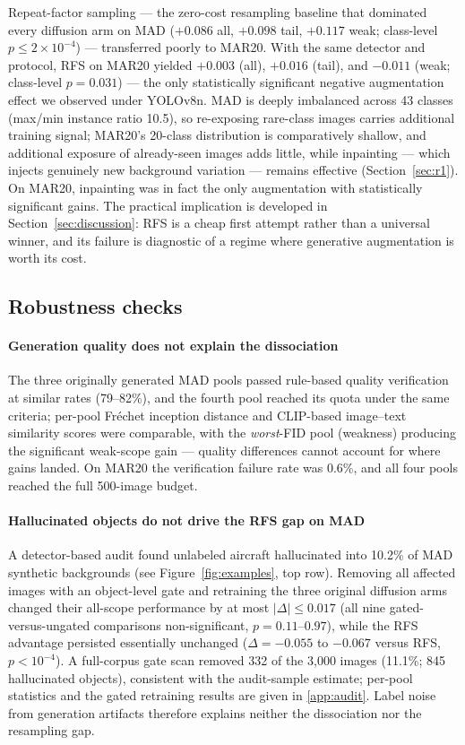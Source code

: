 \documentclass[preprint,12pt,authoryear]{elsarticle}
\begin{document}
Repeat-factor sampling --- the zero-cost resampling baseline that
dominated every diffusion arm on MAD ($+0.086$ all, $+0.098$ tail,
$+0.117$ weak; class-level $p \leq 2\times10^{-4}$) --- transferred
poorly to MAR20. With the same detector and protocol, RFS on MAR20
yielded $+0.003$ (all), $+0.016$ (tail), and $-0.011$ (weak;
class-level $p = 0.031$) --- the only statistically significant negative
augmentation effect we observed under YOLOv8n. MAD is deeply imbalanced
across 43 classes (max/min instance ratio 10.5), so re-exposing
rare-class images carries additional training signal; MAR20's 20-class
distribution is comparatively shallow, and additional exposure of
already-seen images adds little, while inpainting --- which injects
genuinely new background variation --- remains effective
(Section~\ref{sec:r1}). On MAR20, inpainting was in fact the only
augmentation with statistically significant gains. The practical
implication is developed in Section~\ref{sec:discussion}: RFS is a cheap
first attempt rather than a universal winner, and its failure is
diagnostic of a regime where generative augmentation is worth its cost.

\subsection{Robustness checks}\label{sec:robust}

\paragraph{Generation quality does not explain the dissociation}
The three originally generated MAD pools passed rule-based quality
verification at similar rates (79--82\%), and the fourth pool reached
its quota under the same criteria; per-pool Fr\'{e}chet inception
distance \citep[FID;][]{heusel2017fid} and CLIP-based image--text
similarity scores \citep{radford2021clip} were comparable, with the
\emph{worst}-FID pool (weakness) producing the significant weak-scope
gain --- quality differences cannot account for where gains landed. On
MAR20 the verification failure rate was 0.6\%, and all four pools
reached the full 500-image budget.

\paragraph{Hallucinated objects do not drive the RFS gap on MAD}
A detector-based audit found unlabeled aircraft hallucinated into 10.2\%
of MAD synthetic backgrounds (see Figure~\ref{fig:examples}, top row).
Removing all affected images with an object-level gate and retraining
the three original diffusion arms changed their all-scope performance by
at most $|\Delta| \leq 0.017$ (all nine gated-versus-ungated comparisons
non-significant, $p = 0.11$--$0.97$), while the RFS advantage persisted
essentially unchanged ($\Delta = -0.055$ to $-0.067$ versus RFS,
$p < 10^{-4}$). A full-corpus gate scan removed 332 of the 3{,}000
images (11.1\%; 845 hallucinated objects), consistent with the
audit-sample estimate; per-pool statistics and the gated retraining
results are given in \ref{app:audit}. Label noise from generation
artifacts therefore explains neither the dissociation nor the
resampling gap.
\end{document}
